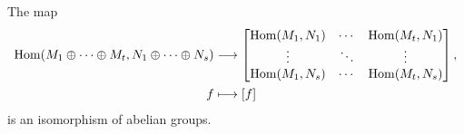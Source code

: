\begin{theorem}
  \label{theorem: bijection homomorphisms matrices}
  The map
  \begin{align*}
    \operatorname{Hom}(M_1 \oplus \dotsb \oplus M_t, N_1 \oplus \dotsb \oplus N_s)
    &\longrightarrow
    \begin{bmatrix}
      \operatorname{Hom}(M_1, N_1)  & \cdots  & \operatorname{Hom}(M_t, N_1)  \\
      \vdots          & \ddots  & \vdots          \\
      \operatorname{Hom}(M_1, N_s)  & \cdots  & \operatorname{Hom}(M_t, N_s)
    \end{bmatrix},
    \\
    f
    &\longmapsto
    [f]
  \end{align*}
  is an isomorphism of abelian groups.
\end{theorem}



